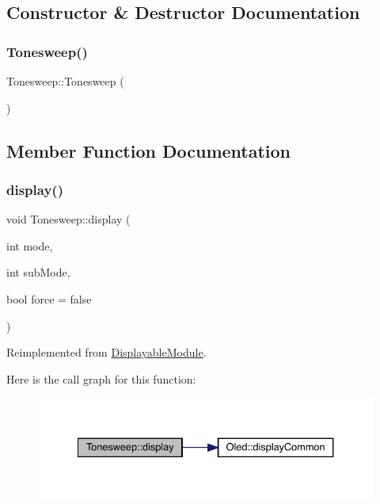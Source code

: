 \subsection{Constructor \& Destructor Documentation}
\mbox{\label{class_tonesweep_a72bce7be13a86848579bf58e8dc28dee}} 
\subsubsection{\texorpdfstring{Tonesweep()}{Tonesweep()}}
{\footnotesize\ttfamily Tonesweep\+::\+Tonesweep (\begin{DoxyParamCaption}{ }\end{DoxyParamCaption})}



\subsection{Member Function Documentation}
\mbox{\label{class_tonesweep_ad16e1b0c7eb84827c3ee8a6ae43b0e81}} 
\subsubsection{\texorpdfstring{display()}{display()}}
{\footnotesize\ttfamily void Tonesweep\+::display (\begin{DoxyParamCaption}\item[{int}]{mode,  }\item[{int}]{sub\+Mode,  }\item[{bool}]{force = {\ttfamily false} }\end{DoxyParamCaption})\hspace{0.3cm}{\ttfamily [virtual]}}



Reimplemented from \mbox{\hyperlink{class_displayable_module_a02de26d62ef508cae9ed07920e21784d}{Displayable\+Module}}.

Here is the call graph for this function\+:\nopagebreak
\begin{figure}[H]
\begin{center}
\leavevmode
\includegraphics[width=334pt]{class_tonesweep_ad16e1b0c7eb84827c3ee8a6ae43b0e81_cgraph}
\end{center}
\end{figure}
\mbox{\label{class_tonesweep_ae427b7379a9f769aa05aeca6ad77bdd5}} 
